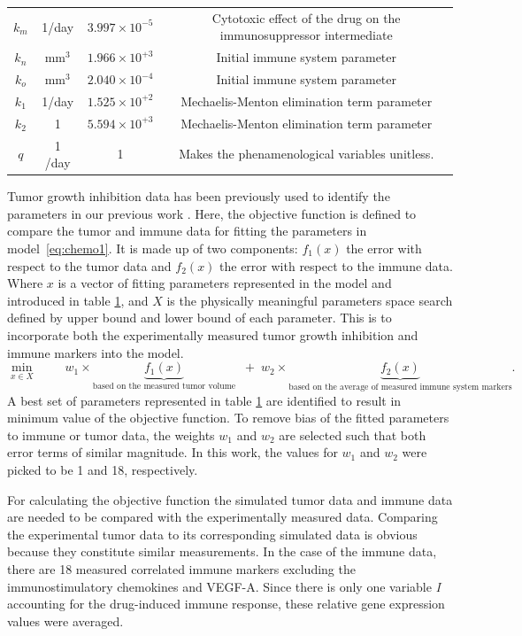 \begin{landscape}
\begin{table}
\begin{tabular}{c c c c}
			$k_m$       & 1/day     & $3.997\times10^{-5}$  & Cytotoxic effect of the drug on the immunosuppressor intermediate\\
			$k_n$       & mm$^3$    & $1.966\times 10^{+3}$ & Initial immune system parameter \\ 
			$k_o$       & mm$^3$    & $2.040\times10^{-4}$  & Initial immune system parameter \\ 
			$k_1$       & 1/day     & $1.525\times 10^{+2}$ & Mechaelis-Menton elimination term parameter\\ 
			$k_2$       & 1         & $5.594\times 10^{+3}$ & Mechaelis-Menton elimination term parameter\\ 
			$q$       & 1 /day        & 1 & Makes the phenamenological variables unitless. \\ 
			\hline
		\end{tabular}
		\label{table:chemo1}
	\end{table}
\end{landscape}
%
Tumor growth inhibition data has been previously used to identify the parameters in our previous work \cite{tran2020delicate}. Here, the objective function is defined to compare the tumor and immune data for fitting the parameters in model~\eqref{eq:chemo1}. It is made up of two components: $f_1(x)$ the error with respect to the tumor data and $f_2(x)$ the error with respect to the immune data. Where $x$ is a vector of fitting parameters represented in the model and introduced in table \ref{table:chemo1}, and $X$ is the physically meaningful parameters space search defined by upper bound and lower bound of each parameter. This is to incorporate both the experimentally measured tumor growth inhibition and immune markers into the model.
%
\begin{equation} \label{objective}
	\min_{x\in X}\; \qquad w_1\times\underbrace{f_1(x)}_\textrm{based on the measured tumor volume}\;\;+\; w_2\times\underbrace{f_2(x)}_\textrm{based on the average of measured immune system markers}.
\end{equation}
%
A best set of parameters represented in table \ref{table:chemo1} are identified to result in minimum value of the objective function. To remove bias of the fitted parameters to immune or tumor data, the weights $w_1$ and $w_2$ are selected such that both error terms of similar magnitude. In this work, the values for $w_1$ and $w_2$ were picked to be 1 and 18, respectively.

For calculating the objective function the simulated tumor data and immune data are needed to be compared with the experimentally measured data. Comparing the experimental tumor data to its corresponding simulated data is obvious because they constitute similar measurements. 
In the case of the immune data, there are 18 measured correlated immune markers excluding the immunostimulatory chemokines and VEGF-A. Since there is only one variable \textit{I} accounting for the drug-induced immune response, these relative gene expression values were averaged. 

